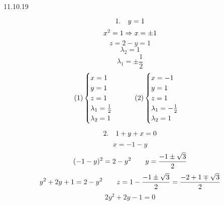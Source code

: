 \documentclass[12pt, fleqn]{article}
\begin{document}
\begin{lect} {11.10.19}
\begin{Task}[3]
            \[1. \quad y = 1\]
            \[x^2 = 1 \Rightarrow x = \pm 1\]
            \[z = 2 - y = 1\]
            \[\lambda_2 = 1\]
            \[\lambda_1 = \pm \frac{1}{2}\]
            \[(1) \begin{cases}
                x = 1\\
                y = 1\\
                z = 1\\
                \lambda_1 = \frac{1}{2}\\
                \lambda_2 = 1
            \end{cases} \qquad (2) \begin{cases}
                x = -1\\
                y = 1\\
                z = 1\\
                \lambda_1 = -\frac{1}{2}\\
                \lambda_2 = 1
            \end{cases}\]

            \[2. \quad 1 + y + x = 0\]
            \[x = -1 - y\]
            \[(-1 - y)^2 = 2 - y^2 \qquad y = \frac{-1 \pm \sqrt{3}}{2}\]
            \[y^2 + 2y + 1 = 2 - y^2 \qquad z = 1 - \frac{-1 \pm \sqrt{3}}{2} = 
            \frac{-2 + 1 \mp \sqrt{3}}{2}\]
            \[2y^2 + 2y - 1 = 0\]      
        \end{Task}
    \end{lect} 
\end{document}

